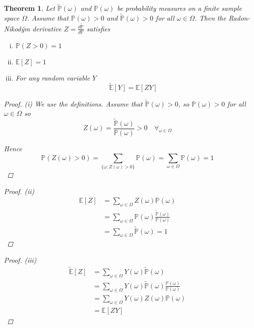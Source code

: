\documentclass[12pt]{article}
\newtheorem{theorem}{Theorem}
\renewcommand{\P}{\mathbb P}
\newcommand{\E}{\mathbb E}
\begin{document}
\begin{theorem} Let $\tilde{\P}(\omega)$ and $\P(\omega)$ be probability measures on a finite sample space $\Omega$. Assume that $\P(\omega) > 0$ and $\tilde{\P}(\omega) > 0$ for all $\omega \in \Omega$. Then the Radon-Nikod\'{y}m derivative $Z = \frac{ d\tilde{\P} }{ d\P }$ satisfies
\begin{enumerate}[(i)]
	\item $\P(Z > 0) = 1$
	\item $\E[Z] = 1$
	\item For any random variable $Y$
	\begin{equation*}
		\tilde{\E}[Y] = \E[ZY]
	\end{equation*}
\end{enumerate}

\begin{proof} (i) We use the definitions. Assume that $\tilde{\P}(\omega) > 0$, so $\P(\omega) > 0$ for all $\omega \in \Omega$ so
\begin{equation*}
	Z(\omega) = \frac{ \tilde{\P}(\omega) }{ \P(\omega) } > 0 \quad \forall_{\omega\in\Omega}
\end{equation*}

Hence
\begin{equation*}
	\P( Z(\omega) > 0 ) = \sum_{\{ \omega: Z(\omega) > 0 \}} \P(\omega) = \sum_{ \omega \in \Omega } \P(\omega) = 1
\end{equation*}
\end{proof}

\begin{proof} (ii)
	\begin{align*}
		\E[Z] &= \sum_{\omega \in \Omega} Z(\omega) \P(\omega) \\
		&= \sum_{\omega \in \Omega} \P(\omega)\frac{ \tilde{\P}(\omega) }{ \P(\omega) } \\
		&= \sum_{\omega \in \Omega} \tilde{\P}(\omega) = 1
	\end{align*}
\end{proof}

\begin{proof} (iii)
	\begin{align*}
		\tilde{\E}[Z] &= \sum_{\omega \in \Omega} Y(\omega)\tilde{\P}(\omega) \\
		&= \sum_{\omega \in \Omega} Y(\omega) \tilde{\P}(\omega) \frac{ \P(\omega) }{ \P(\omega) } \\
		&= \sum_{\omega \in \Omega} Y(\omega) Z(\omega) \P(\omega) \\
		&= \E[ZY]
	\end{align*}
\end{proof}
\end{theorem}
\end{document}

